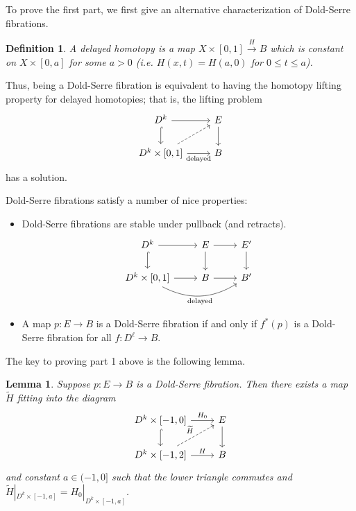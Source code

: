 \documentclass{article}
\newtheorem{lemma}[theorem]{Lemma}
\newtheorem{definition}[theorem]{Definition}
\newtheorem{proposed work}[theorem]{Proposed Work}
\theoremstyle{definition}
\begin{document}
To prove the first part, we first give an alternative characterization of Dold-Serre fibrations.

\begin{definition}
A \emph{delayed homotopy} is a map $X \times [0,1] \overset{H}{\to} B$ which is constant on $X \times [0,a]$ for some $a > 0$ (i.e. $H(x,t) = H(a,0)$ for $0 \leq t \leq a$).
\end{definition}

Thus, being a Dold-Serre fibration is equivalent to having the homotopy lifting property for delayed homotopies; that is, the lifting problem
\begin{equation*}
\begin{tikzcd}
D^k \arrow[r] \arrow[d,hookrightarrow] & E \arrow[d] \\
D^k \times [0,1] \arrow[r, "\text{delayed}"'] \arrow[ur, dashed] & B
\end{tikzcd}
\end{equation*}
has a solution.

Dold-Serre fibrations satisfy a number of nice properties:

\begin{itemize}
\item Dold-Serre fibrations are stable under pullback (and retracts).
\begin{equation*}
\begin{tikzcd}
D^k \arrow[r] \arrow[d,hookrightarrow] & E \arrow[r] \arrow[d] & E' \arrow[d] \\
D^k \times [0,1] \arrow[r] \arrow[rr, "\text{delayed}"',bend right]& B \arrow[r] & B'
\end{tikzcd}
\end{equation*}

\item A map $p: E \to B$ is a Dold-Serre fibration if and only if $f^*(p)$ is a Dold-Serre fibration for all $f: D^\ell \to B$. 
\end{itemize}

The key to proving part 1 above is the following lemma.

\begin{lemma}
Suppose $p: E \to B$ is a Dold-Serre fibration. Then there exists a map $\widetilde{H}$ fitting into the diagram
\begin{equation*}
\begin{tikzcd}
D^k \times [-1,0] \arrow[r, "H_0"] \arrow[d, hookrightarrow] & E \arrow[d] \\
D^k \times [-1,2] \arrow[ur, dashed, "\widetilde{H}"] \arrow[r, "H"] & B
\end{tikzcd}
\end{equation*}
and constant $a \in (-1,0]$ such that the lower triangle commutes and $\widetilde{H}|_{D^k \times [-1,a]} = H_0|_{D^k \times [-1,a]}$.
\end{lemma}
\end{document}
